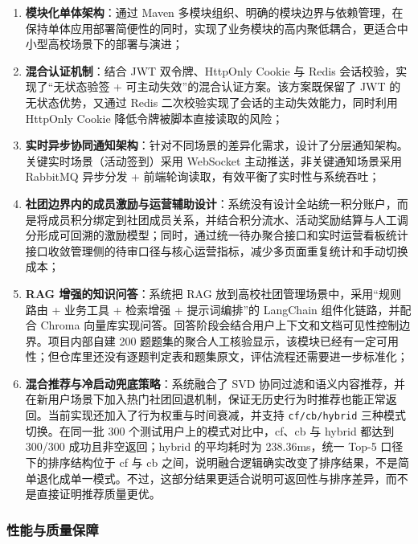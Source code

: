 \begin{enumerate}
  \item \textbf{模块化单体架构}：通过 Maven 多模块组织、明确的模块边界与依赖管理，在保持单体应用部署简便性的同时，实现了业务模块的高内聚低耦合，更适合中小型高校场景下的部署与演进；

  \item \textbf{混合认证机制}：结合 JWT 双令牌、HttpOnly Cookie 与 Redis 会话校验，实现了“无状态验签 + 可主动失效”的混合认证方案。该方案既保留了 JWT 的无状态优势，又通过 Redis 二次校验实现了会话的主动失效能力，同时利用 HttpOnly Cookie 降低令牌被脚本直接读取的风险；

  \item \textbf{实时异步协同通知架构}：针对不同场景的差异化需求，设计了分层通知架构。关键实时场景（活动签到）采用 WebSocket 主动推送，非关键通知场景采用 RabbitMQ 异步分发 + 前端轮询读取，有效平衡了实时性与系统吞吐；

  \item \textbf{社团边界内的成员激励与运营辅助设计}：系统没有设计全站统一积分账户，而是将成员积分绑定到社团成员关系，并结合积分流水、活动奖励结算与人工调分形成可回溯的激励模型；同时，通过统一待办聚合接口和实时运营看板统计接口收敛管理侧的待审口径与核心运营指标，减少多页面重复统计和手动切换成本；

  \item \textbf{RAG 增强的知识问答}：系统把 RAG 放到高校社团管理场景中，采用“规则路由 + 业务工具 + 检索增强 + 提示词编排”的 LangChain 组件化链路，并配合 Chroma 向量库实现问答。回答阶段会结合用户上下文和文档可见性控制边界。项目内部自建 200 题题集的聚合人工核验显示，该模块已经有一定可用性；但仓库里还没有逐题判定表和题集原文，评估流程还需要进一步标准化；

  \item \textbf{混合推荐与冷启动兜底策略}：系统融合了 SVD 协同过滤和语义内容推荐，并在新用户场景下加入热门社团回退机制，保证无历史行为时推荐也能正常返回。当前实现还加入了行为权重与时间衰减，并支持 \texttt{cf/cb/hybrid} 三种模式切换。在同一批 300 个测试用户上的模式对比中，cf、cb 与 hybrid 都达到 300/300 成功且非空返回；hybrid 的平均耗时为 238.36ms，统一 Top-5 口径下的排序结构位于 cf 与 cb 之间，说明融合逻辑确实改变了排序结果，不是简单退化成单一模式。不过，这部分结果更适合说明可返回性与排序差异，而不是直接证明推荐质量更优。
\end{enumerate}

\subsubsection{性能与质量保障}

